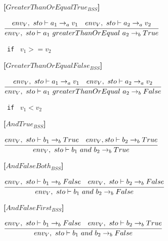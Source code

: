 \textbf{[$GreaterThanOrEqualTrue_{BSS}$]}\\
\begin{center}
	\begin{math}
	\cfrac
	{env_V,\ sto \vdash a_1 \rightarrow_a v_1 \quad env_V,\ sto \vdash a_2 \rightarrow_a v_2}
	{env_V,\ sto \vdash a_1\ greaterThanOrEqual\ a_2 \rightarrow_b True}
	\end{math}
	
	\texttt{ if } $v_1 >= v_2$
\end{center}

\textbf{[$GreaterThanOrEqualFalse_{BSS}$]}\\
\begin{center}
	\begin{math}
	\cfrac
	{env_V,\ sto \vdash a_1 \rightarrow_a v_1 \quad env_V,\ sto \vdash a_2 \rightarrow_a v_2}
	{env_V,\ sto \vdash a_1\ greaterThanOrEqual\ a_2 \rightarrow_b False}
	\end{math}
	
	\texttt{ if } $v_1 < v_2$
\end{center}

\textbf{[$AndTrue_{BSS}$]}\\
\begin{center}
	\begin{math}
	\cfrac
		{env_V,\ sto \vdash b_1 \rightarrow_b True \quad env_V, sto \vdash b_2 \rightarrow_b True}
		{env_V,\ sto \vdash b_1\ and\ b_2 \rightarrow_b True}
	\end{math}
\end{center}

\textbf{[$AndFalseBoth_{BSS}$]}\\
\begin{center}
	\begin{math}
	\cfrac
		{env_V,\ sto \vdash b_1 \rightarrow_b False \quad env_V,\ sto \vdash b_2 \rightarrow_b False}
		{env_V,\ sto \vdash b_1\ and\ b_2 \rightarrow_b False}
	\end{math}
\end{center}

\textbf{[$AndFalseFirst_{BSS}$]}\\
\begin{center}
	\begin{math}
	\cfrac
	{env_V,\ sto \vdash b_1 \rightarrow_b False \quad env_V,\ sto \vdash b_2 \rightarrow_b True}
	{env_V,\ sto \vdash b_1\ and\ b_2 \rightarrow_b False}
	\end{math}
\end{center}

